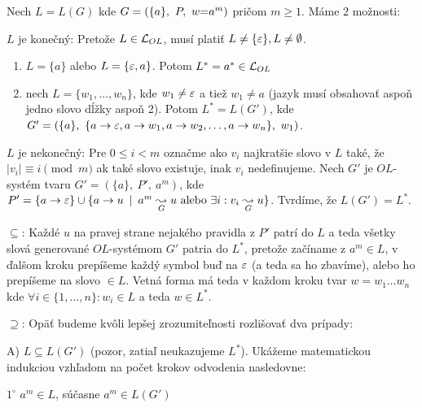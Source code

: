 \begin{dokaz}
  Nech $L=L(G)$ kde $G=(\{a\},\ P,\ w\mbox{=} a^{m})$ pričom $m\geq1$. Máme 2 možnosti:

  \begin{enumerate}
    \item $L$ je konečný: Pretože $L \in \mathcal{L}_{OL}$, musí platiť
      $L \ne \{\varepsilon\}, L \ne \emptyset$.
      \begin{enumerate}
        \item $L=\{a\}$ alebo $L=\{\varepsilon,a\}$. Potom
          $L^{*}=a^{*} \in \mathcal{L}_{OL}$

        \item nech $L=\{w_{1},\dots,w_{n}\}$, kde
          $w_{1}\neq\varepsilon$ a tiež $w_{1}\neq a$ (jazyk musí obsahovať aspoň
          jedno slovo dĺžky aspoň 2).
          Potom $L^{*}=L(G')$, kde $G'=(\{a\},\ 
          \{a \pravidlo \eps, a\pravidlo w_1, a \pravidlo w_2, \dots,
          a \pravidlo w_{n}\},\ w_{1})$.
      \end{enumerate}

    \item $L$ je nekonečný:
      Pre $0 \le i < m$ označme ako $v_i$
      najkratšie slovo v $L$ také, že $|v_{i}|\equiv i \pmod{m}$ ak 
      také slovo existuje, inak $v_i$ nedefinujeme.
      Nech $G'$ je $OL$-systém tvaru $G'=(\{a\},\ P',\ a^{m})$, kde
      $P'=\{a\rightarrow\varepsilon\}\cup
          \{a\rightarrow u \enspace |\enspace a^{m} \underset{G}{\leadsto} u
          \mbox{ alebo }
          \exists i: v_{i} \underset{G}{\leadsto} u\}$.
      Tvrdíme, že $L(G')=L^{*}$.

      \begin{description}
        \item{$\subseteq$:} Každé $u$ na pravej strane nejakého
          pravidla z $P'$ patrí do
          $L$ a teda všetky slová generované $OL$-systémom $G'$ patria do
          $L^{*}$, pretože začíname z $a^{m}\in L$, v ďalšom kroku prepíšeme
          každý symbol buď na $\varepsilon$ (a teda sa ho zbavíme), alebo ho
          prepíšeme na slovo $\in L$. Vetná forma má teda v každom kroku
          tvar $w=w_1 \dots w_n$ kde
          $\forall i\in\{1,\dots,n\}:w_i\in L$ a teda $w\in L^{*}$.

        \item{$\supseteq$:} Opäť budeme kvôli lepšej zrozumiteľnosti
          rozlišovať dva prípady:
          \begin{description}
            \item{A)} $L\subseteq L(G')$ (pozor, zatiaľ neukazujeme $L^*$).
              Ukážeme matematickou indukciou vzhľadom na počet krokov
              odvodenia nasledovne:
              \begin{description}
              \item{$1^{\circ}$} $a^{m}\in L$, súčasne $a^{m}\in L(G')$


\end{description}
\end{description}
\end{description}
\end{enumerate}
\end{dokaz}
